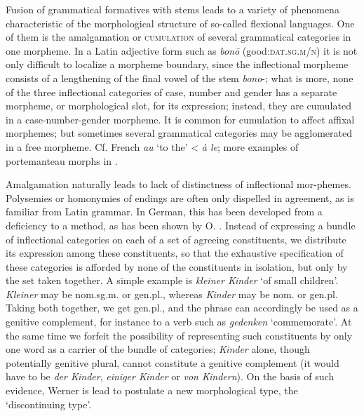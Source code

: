 Fusion of grammatical formatives with stems leads to a variety of phenomena characteristic of the morphological structure of so-called flexional languages. One of them is the amalgamation or \textsc{cumulation} of several grammatical categories in one morpheme. In a Latin adjective form such as \textit{bon\=o} (good:\textsc{dat.sg.m/n}) it is not only difficult to localize a morpheme boundary, since the inflectional morpheme consists of a lengthening of the final vowel of the stem \textit{bono}{}-; what is more, none of the three inflectional categories of case, number and gender has a separate morpheme, or morphological slot, for its expression; instead, they are cumulated in a case-number-gender morpheme. It is common for cumulation to affect affixal morphemes; but sometimes several grammatical categories may be agglomerated in a free morpheme. Cf. French \textit{au} ‘to the’ {\textless} \textit{à le}; more examples of portemanteau morphs in \citealt[§6]{JeffersEtAl1980}.

Amalgamation naturally leads to lack of distinctness of inflectional mor-\linebreak phemes. Polysemies or homonymies of endings are often only dispelled in agreement, as is familiar from Latin grammar. In German, this has been developed from a deficiency to a method, as has been shown by O. \citet{Werner1979}. Instead of expressing a bundle of inflectional categories on each of a set of agreeing constituents, we distribute its expression among these constituents, so that the exhaustive specification of these categories is afforded by none of the constituents in isolation, but only by the set taken together. A simple example is \textit{kleiner Kinder} ‘of small children’. \textit{Kleiner} may be nom.sg.m. or gen.pl., whereas \textit{Kinder} may be nom. or gen.pl. Taking both together, we get gen.pl., and the phrase can accordingly be used as a genitive complement, for instance to a verb such as \textit{gedenken} ‘commemorate’. At the same time we forfeit the possibility of representing such constituents by only one word as a carrier of the bundle of categories; \textit{Kinder} alone, though potentially genitive plural, cannot constitute a genitive complement (it would have to be \textit{der Kinder}, \textit{einiger Kinder} or \textit{von Kindern}). On the basis of such evidence, Werner is lead to postulate a new morphological type, the ‘discontinuing type’.

